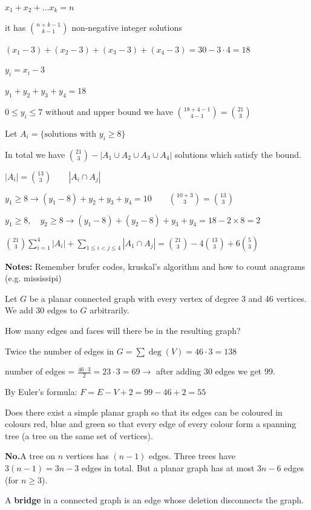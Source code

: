\documentclass[9pt, letterpaper, oneside]{article}
\begin{document}
$x_1 + x_2 + \ldots x_k = n$

it has ${n+k - 1 \choose k -1}$ non-negative integer solutions 

$(x_1 -3) + (x_2 -3) + (x_3 - 3) + (x_4 - 3) = 30 - 3 \cdot 4 = 18$

$y_i = x_i - 3$

$y_1 + y_2 + y_3 + y_4 = 18$

$0 \leq y_i \leq 7$ without and upper bound we have ${18 + 4 -1 \choose 4 -1} = {21 \choose 3}$

Let $A_i = \{\text{solutions with }y_i \geq 8 \}$

In total we have ${21 \choose 3} - |A_1 \cup A_2 \cup A_3 \cup A_4|$ solutions which satisfy the bound.

$|A_i| = {13 \choose 3} \qquad |A_i \cap A_j|$

$y_1 \geq 8 \to (y_1 - 8) + y_2 + y_3 + y_4 = 10 \qquad {10+3 \choose 3} = {13 \choose 3}$

$y_1 \geq 8, \quad y_2 \geq 8 \to (y_1 - 8) + (y_2-8) + y_3 + y_4 = 18 - 2 \times 8 = 2$

${21 \choose 3} \sum^4_{i=1} |A_i| + \sum_{1 \leq i < j \leq 4} |A_1 \cap A_j| = {21 \choose 3} - 4{13 \choose 3} + 6 {5 \choose 3}$

\textbf{Notes:}
Remember brufer codes, kruskal's algorithm and how to count anagrams (e.g. mississipi)

Let $G$ be a planar connected graph with every vertex of degree 3 and 46 vertices. We add 30 edges to $G$ arbitrarily.

How many edges and faces will there be in the resulting graph?

Twice the number of edges in $G = \sum \deg (V) = 46 \cdot 3 = 138$ 

number of edges = $\frac{46 \cdot 3}{2} = 23 \cdot 3 = 69 \to$ after adding 30 edges we get 99.
 
By Euler's formula: $F = E - V +2 = 99 - 46 + 2 = 55$

Does there exist a simple planar graph so that its edges can be coloured in colours red, blue and green so that every edge of every colour form a spanning tree (a tree on the same set of vertices).

\textbf{No.}A tree on $n$ vertices has $(n-1)$ edges. Three trees have $3 (n-1) = 3n-3$ edges in total. But a planar graph has at most $3n-6$ edges (for $n \geq 3$).

A \textbf{bridge} in a connected graph is an edge whose deletion disconnects the graph.
\end{document}
